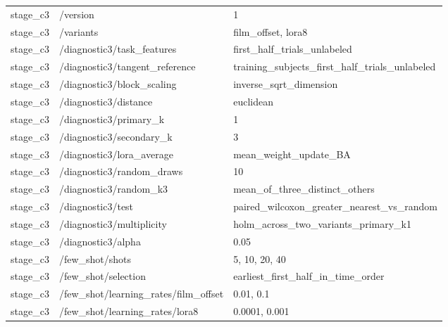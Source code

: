 \begin{longtable}{p{.65in}p{2.8in}p{3.2in}}
stage\_\allowbreak{}c3 & /version & 1 \\
stage\_\allowbreak{}c3 & /variants & film\_\allowbreak{}offset, lora8 \\
stage\_\allowbreak{}c3 & /diagnostic3/task\_\allowbreak{}features & first\_\allowbreak{}half\_\allowbreak{}trials\_\allowbreak{}unlabeled \\
stage\_\allowbreak{}c3 & /diagnostic3/tangent\_\allowbreak{}reference & training\_\allowbreak{}subjects\_\allowbreak{}first\_\allowbreak{}half\_\allowbreak{}trials\_\allowbreak{}unlabeled \\
stage\_\allowbreak{}c3 & /diagnostic3/block\_\allowbreak{}scaling & inverse\_\allowbreak{}sqrt\_\allowbreak{}dimension \\
stage\_\allowbreak{}c3 & /diagnostic3/distance & euclidean \\
stage\_\allowbreak{}c3 & /diagnostic3/primary\_\allowbreak{}k & 1 \\
stage\_\allowbreak{}c3 & /diagnostic3/secondary\_\allowbreak{}k & 3 \\
stage\_\allowbreak{}c3 & /diagnostic3/lora\_\allowbreak{}average & mean\_\allowbreak{}weight\_\allowbreak{}update\_\allowbreak{}BA \\
stage\_\allowbreak{}c3 & /diagnostic3/random\_\allowbreak{}draws & 10 \\
stage\_\allowbreak{}c3 & /diagnostic3/random\_\allowbreak{}k3 & mean\_\allowbreak{}of\_\allowbreak{}three\_\allowbreak{}distinct\_\allowbreak{}others \\
stage\_\allowbreak{}c3 & /diagnostic3/test & paired\_\allowbreak{}wilcoxon\_\allowbreak{}greater\_\allowbreak{}nearest\_\allowbreak{}vs\_\allowbreak{}random \\
stage\_\allowbreak{}c3 & /diagnostic3/multiplicity & holm\_\allowbreak{}across\_\allowbreak{}two\_\allowbreak{}variants\_\allowbreak{}primary\_\allowbreak{}k1 \\
stage\_\allowbreak{}c3 & /diagnostic3/alpha & 0.05 \\
stage\_\allowbreak{}c3 & /few\_\allowbreak{}shot/shots & 5, 10, 20, 40 \\
stage\_\allowbreak{}c3 & /few\_\allowbreak{}shot/selection & earliest\_\allowbreak{}first\_\allowbreak{}half\_\allowbreak{}in\_\allowbreak{}time\_\allowbreak{}order \\
stage\_\allowbreak{}c3 & /few\_\allowbreak{}shot/learning\_\allowbreak{}rates/film\_\allowbreak{}offset & 0.01, 0.1 \\
stage\_\allowbreak{}c3 & /few\_\allowbreak{}shot/learning\_\allowbreak{}rates/lora8 & 0.0001, 0.001 \\

\end{longtable}
